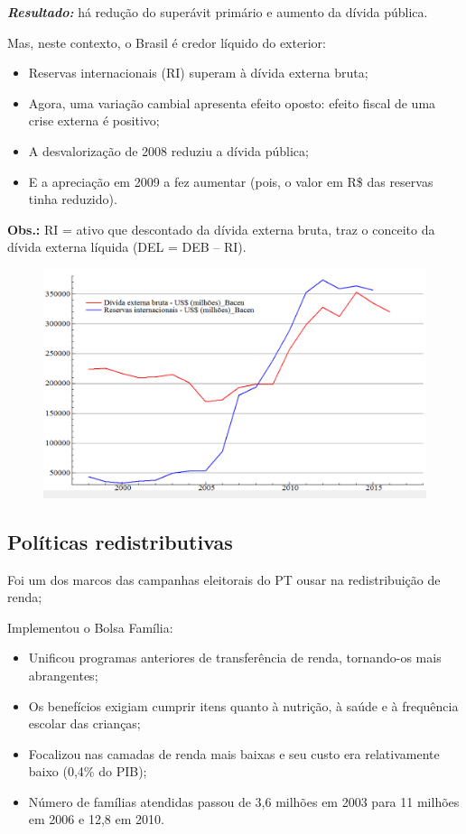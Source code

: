 \documentclass[a4paper,12pt]{article}[abntex2]
\begin{document}
\textit{\textbf{Resultado:}} há redução do superávit primário e aumento da dívida pública.

Mas, neste contexto, o Brasil é credor líquido do exterior:
\begin{itemize}
    \item Reservas internacionais (RI) superam à dívida externa bruta;
    \item Agora, uma variação cambial apresenta efeito oposto: efeito fiscal de uma crise externa é positivo;
    \item A desvalorização de 2008 reduziu a dívida pública;
    \item E a apreciação em 2009 a fez aumentar (pois, o valor em R\$ das reservas tinha reduzido).
\end{itemize}

\textbf{Obs.:} RI = ativo que descontado da dívida externa bruta, traz o conceito da dívida externa líquida (DEL = DEB – RI).

\begin{figure}[H]
    \centering
    \includegraphics[width=0.7\linewidth]{Imagens/a16i10.png}
\end{figure}

\subsection{\textbf{Políticas redistributivas}}
Foi um dos marcos das campanhas eleitorais do PT ousar na redistribuição de renda;

Implementou o Bolsa Família:
    \begin{itemize}
        \item Unificou programas anteriores de transferência de renda, tornando-os mais abrangentes;
        \item Os benefícios exigiam cumprir itens quanto à nutrição, à saúde e à frequência escolar das crianças;
        \item Focalizou nas camadas de renda mais baixas e seu custo era relativamente baixo (0,4\% do PIB);
        \item Número de famílias atendidas passou de 3,6 milhões em 2003 para 11 milhões em 2006 e 12,8 em 2010.
\end{itemize}
\end{document}

